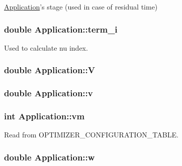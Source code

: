 \hyperlink{classApplication}{Application}'s stage (used in case of residual time) 

\hypertarget{classApplication_ad5486702327ad61e56ed04fb54d58c20}{
\subsubsection[{term\-\_\-i}]{\setlength{\rightskip}{0pt plus 5cm}double Application\-::term\-\_\-i}}\label{classApplication_ad5486702327ad61e56ed04fb54d58c20}


Used to calculate nu index. 

\hypertarget{classApplication_aa92ad37e6701931176e0dc9b260fd7ee}{
\subsubsection[{V}]{\setlength{\rightskip}{0pt plus 5cm}double Application\-::\-V}}\label{classApplication_aa92ad37e6701931176e0dc9b260fd7ee}
\hypertarget{classApplication_a9efc167094a42382504dd28a7ac402e0}{
\subsubsection[{v}]{\setlength{\rightskip}{0pt plus 5cm}double Application\-::v}}\label{classApplication_a9efc167094a42382504dd28a7ac402e0}
\hypertarget{classApplication_a0a3fe386eb8244e536bc5297709d1269}{
\subsubsection[{vm}]{\setlength{\rightskip}{0pt plus 5cm}int Application\-::vm}}\label{classApplication_a0a3fe386eb8244e536bc5297709d1269}


Read from O\-P\-T\-I\-M\-I\-Z\-E\-R\-\_\-\-C\-O\-N\-F\-I\-G\-U\-R\-A\-T\-I\-O\-N\-\_\-\-T\-A\-B\-L\-E. 

\hypertarget{classApplication_aead1b7b0150c2a3ebd6c36b1db8c4732}{
\subsubsection[{w}]{\setlength{\rightskip}{0pt plus 5cm}double Application\-::w}}\label{classApplication_aead1b7b0150c2a3ebd6c36b1db8c4732}


